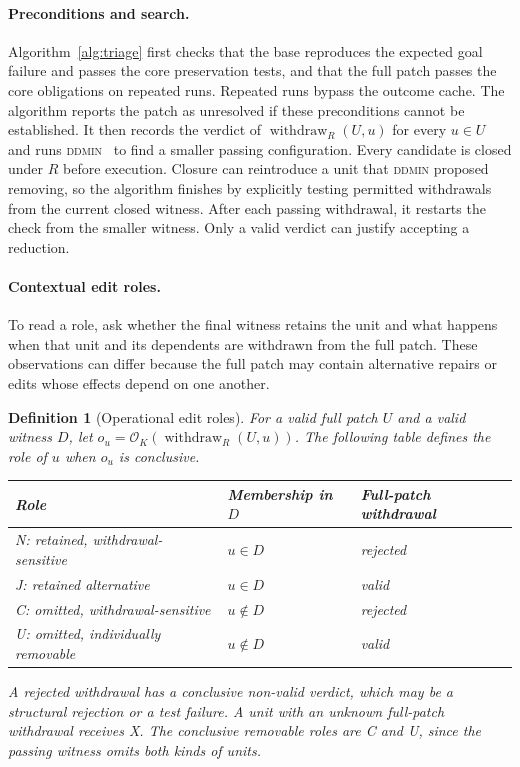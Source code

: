 \documentclass[a4paper,fleqn]{cas-sc}
\newcommand{\lab}[1]{\textsf{#1}}
\newcommand{\withdraw}{\operatorname{withdraw}}
\newtheorem{definition}{Definition}
\begin{document}
\paragraph{Preconditions and search.} Algorithm~\ref{alg:triage} first checks that the base reproduces the expected goal failure and passes the core preservation tests, and that the full patch passes the core obligations on repeated runs. Repeated runs bypass the outcome cache. The algorithm reports the patch as unresolved if these preconditions cannot be established. It then records the verdict of $\withdraw_R(U,u)$ for every $u\in U$ and runs \textsc{ddmin}~\citep{zeller2002ddmin} to find a smaller passing configuration. Every candidate is closed under $R$ before execution. Closure can reintroduce a unit that \textsc{ddmin} proposed removing, so the algorithm finishes by explicitly testing permitted withdrawals from the current closed witness. After each passing withdrawal, it restarts the check from the smaller witness. Only a \lab{valid} verdict can justify accepting a reduction.

\paragraph{Contextual edit roles.} To read a role, ask whether the final witness retains the unit and what happens when that unit and its dependents are withdrawn from the full patch. These observations can differ because the full patch may contain alternative repairs or edits whose effects depend on one another.

\begin{definition}[Operational edit roles]\label{def:roles}
For a valid full patch $U$ and a valid witness $D$, let $o_u=\mathcal{O}_K(\withdraw_R(U,u))$. The following table defines the role of $u$ when $o_u$ is conclusive.
\begin{center}
\begin{tabular}{lll}
\toprule
Role & Membership in $D$ & Full-patch withdrawal \\
\midrule
\lab{N}: retained, withdrawal-sensitive & $u\in D$ & rejected \\
\lab{J}: retained alternative & $u\in D$ & valid \\
\lab{C}: omitted, withdrawal-sensitive & $u\notin D$ & rejected \\
\lab{U}: omitted, individually removable & $u\notin D$ & valid \\
\bottomrule
\end{tabular}
\end{center}
A rejected withdrawal has a conclusive non-valid verdict, which may be a structural rejection or a test failure. A unit with an unknown full-patch withdrawal receives \lab{X}. The conclusive removable roles are \lab{C} and \lab{U}, since the passing witness omits both kinds of units.
\end{definition}
\end{document}
